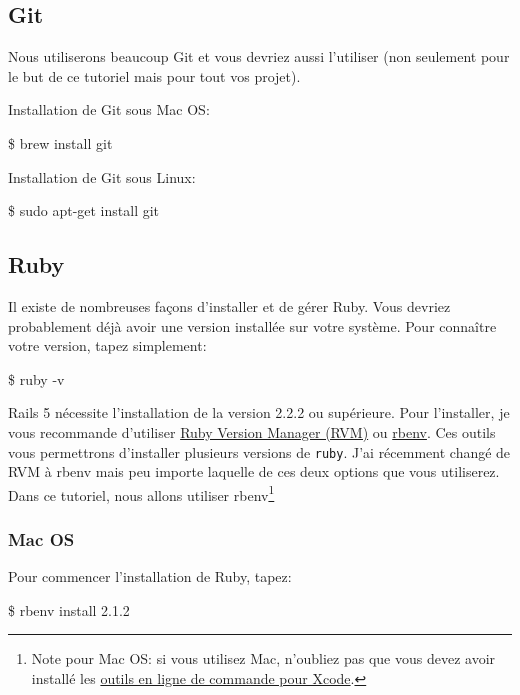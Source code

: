 \documentclass[]{report}
\begin{document}
    \subsection{Git}
      \label{setup_git}

      Nous utiliserons beaucoup Git et vous devriez aussi l'utiliser (non seulement pour le but de ce tutoriel mais pour tout vos projet).

      Installation de Git sous Mac OS:
      \begin{bashcode}
      \$ brew install git
      \end{bashcode}

      Installation de Git sous Linux:
      \begin{bashcode}
      \$ sudo apt-get install git
      \end{bashcode}

    \subsection{Ruby}

      Il existe de nombreuses façons d'installer et de gérer Ruby. Vous devriez probablement déjà avoir une version installée sur votre système. Pour connaître votre version, tapez simplement:

      \begin{bashcode}
      \$ ruby -v
      \end{bashcode}

      Rails 5 nécessite l'installation de la version 2.2.2 ou supérieure. Pour l'installer, je vous recommande d'utiliser \href{http://rvm.io/}{Ruby Version Manager (RVM)} ou \href{http://rbenv.org/}{rbenv}. Ces outils vous permettrons d'installer plusieurs versions de \verb|ruby|. J'ai récemment changé de RVM à rbenv mais peu importe laquelle de ces deux options que vous utiliserez. Dans ce tutoriel, nous allons utiliser rbenv\footnote{Note pour Mac OS: si vous utilisez Mac, n'oubliez pas que vous devez avoir installé les \href{https://developer.apple.com/downloads/}{outils en ligne de commande pour Xcode}.}

      \subsubsection{Mac OS}

        Pour commencer l'installation de Ruby, tapez:

        \begin{bashcode}
        \$ rbenv install 2.1.2
        \end{bashcode}
\end{document}
